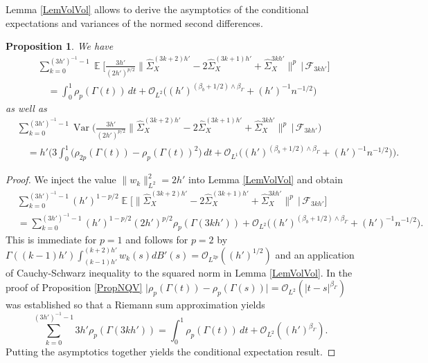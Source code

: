 \documentclass[preprint,aos]{imsart}
\numberwithin{equation}{section}
\newtheorem{proposition}[satz]{Proposition}
\theoremstyle{remark}
\DeclareMathOperator{\E}{{\mathbb E}}
\DeclareMathOperator{\Var}{Var} \DeclareMathOperator{\Cov}{Cov}
\providecommand{\abs}[1]{\lvert #1 \rvert}
\providecommand{\norm}[1]{\lVert #1 \rVert}
\begin{document}
\begin{appendix}
Lemma \ref{LemVolVol} allows to derive the asymptotics of the conditional expectations and variances of the normed second differences.

\begin{proposition}\label{PropCondExpSigmaHat}
We have
\begin{align*} &\sum_{k=0}^{(3h')^{-1}-1}\E\Big[\frac{3h'}{(2h')^{p/2}}\norm{\hat\Sigma_X^{(3k+2)h'}-2\hat\Sigma_X^{(3k+1)h'}+\hat\Sigma_X^{3kh'}}^p\,\Big|\,{\mathcal F}_{3kh'}\Big]\\
 &\quad =\int_0^1 \rho_p(\Gamma(t))\,dt +{\mathcal O}_{L^2}\Big((h')^{(\beta_b+1/2)\wedge \beta_\Gamma}+(h')^{-1}n^{-1/2}\Big)
\end{align*}
as well as
\begin{align*} &\sum_{k=0}^{(3h')^{-1}-1}\Var\Big(\frac{3h'}{(2h')^{p/2}}\norm{\hat\Sigma_X^{(3k+2)h'}-2\hat\Sigma_X^{(3k+1)h'}+\hat\Sigma_X^{3kh'}}^p\,\Big|\,{\mathcal F}_{3kh'}\Big)\\
 &\quad =h'\Big(
 3\int_0^1 \big(\rho_{2p}(\Gamma(t))-\rho_p(\Gamma(t))^2\big)\,dt+{\mathcal O}_{L^1}\Big((h')^{(\beta_b+1/2)\wedge \beta_\Gamma}+(h')^{-1}n^{-1/2}\Big)\Big).
\end{align*}
\end{proposition}

\begin{proof}
We inject the value $\norm{w_k}_{L^2}^2=2h'$ into Lemma \ref{LemVolVol} and obtain
\begin{align*}
&\sum_{k=0}^{(3h')^{-1}-1}(h')^{1-p/2}\E\Big[\norm{\hat\Sigma_X^{(3k+2)h'}-2\hat\Sigma_X^{(3k+1)h'}+\hat\Sigma_X^{3kh'}}^p\,\Big|\,{\mathcal F}_{3kh'}\Big]\\
&=\sum_{k=0}^{(3h')^{-1}-1}(h')^{1-p/2}(2h')^{p/2}\rho_p(\Gamma(3kh'))+{\mathcal O}_{L^2}\Big((h')^{(\beta_b+1/2)\wedge \beta_\Gamma}+(h')^{-1}n^{-1/2}\Big).
\end{align*}
This is immediate for $p=1$ and follows for $p=2$ by $\Gamma((k-1)h')\int_{(k-1)h'}^{(k+2)h'}w_k(s)dB'(s)={\mathcal O}_{L^{2p}}((h')^{1/2})$ and an application of Cauchy-Schwarz inequality to the squared norm in Lemma \ref{LemVolVol}.
In the proof of Proposition \ref{PropNQV} $\abs{\rho_p(\Gamma(t))-\rho_p(\Gamma(s))}={\mathcal O}_{L^2}(\abs{t-s}^{\beta_\Gamma})$ was established so that a Riemann sum approximation yields
\[ \sum_{k=0}^{(3h')^{-1}-1}3h'\rho_p(\Gamma(3kh'))=\int_0^1 \rho_p(\Gamma(t))\,dt+{\mathcal O}_{L^2}((h')^{\beta_\Gamma}).
\]
Putting the asymptotics together yields the conditional expectation result.



\end{proof}
\end{appendix}
\end{document}
